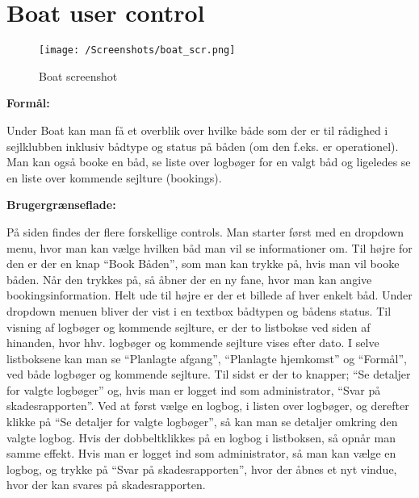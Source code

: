 \section{Boat user control}

\begin{wrapfigure}{l}{0.5\textwidth}
    \label{img:boat_scr}
    \vspace{-20pt}
    \begin{center}
        \texttt{[image: /Screenshots/boat\_scr.png]}
    \end{center}
    \vspace{-20pt}
    \caption{Boat screenshot}
    \vspace{-10pt}
\end{wrapfigure}

\textbf{Formål:}

Under Boat kan man få et overblik over hvilke både som der er til rådighed i sejlklubben inklusiv bådtype og status på båden (om den f.eks. er operationel). 
Man kan også booke en båd, se liste over logbøger for en valgt båd og ligeledes se en liste over kommende sejlture (bookings). 

\textbf{Brugergrænseflade:}

På siden findes der flere forskellige controls.
Man starter først med en dropdown menu, hvor man kan vælge hvilken båd man vil se informationer om.
Til højre for den er der en knap ``Book Båden'', som man kan trykke på, hvis man vil booke båden. Når den trykkes på, så åbner der en ny fane, hvor man kan angive bookingsinformation. 
Helt ude til højre er der et billede af hver enkelt båd. 
Under dropdown menuen bliver der vist i en textbox bådtypen og bådens status. 
Til visning af logbøger og kommende sejlture, er der to listbokse ved siden af hinanden, hvor hhv. logbøger og kommende sejlture vises efter dato. 
I selve listboksene kan man se ``Planlagte afgang'', ``Planlagte hjemkomst'' og ``Formål'', ved både logbøger og kommende sejlture. 
Til sidst er der to knapper; ``Se detaljer for valgte logbøger'' og, hvis man er logget ind som administrator, ``Svar på skadesrapporten''. Ved at først vælge en logbog, i listen over logbøger, og derefter klikke på ``Se detaljer for valgte logbøger'', så kan man se detaljer omkring den valgte logbog. 
Hvis der dobbeltklikkes på en logbog i listboksen, så opnår man samme effekt. 
Hvis man er logget ind som administrator, så man kan vælge en logbog, og trykke på ``Svar på skadesrapporten'', hvor der åbnes et nyt vindue, hvor der kan svares på skadesrapporten. 

